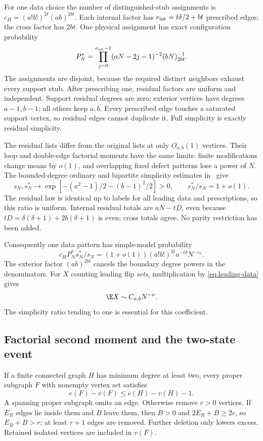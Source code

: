 For one data choice the number of distinguished-stub assignments is
$c_H=(a!b!)^{2t}(ab)^{2bt}$. Each internal factor has
$e_{\rm int}=t\delta/2+bt$ prescribed edges; the cross factor has $2bt$.
One physical assignment has exact configuration probability
\begin{equation}\label{eq:motif-probability}
 P_N^*=\prod_{j=0}^{e_{\rm int}-1}(aN-2j-1)^{-2}(bN)_{2bt}^{-1}.
\end{equation}
The assignments are disjoint, because the required distinct neighbors
exhaust every support stub. After prescribing one, residual factors are
uniform and independent. Support residual degrees are zero; exterior
vertices have degrees $a-1,b-1$; all others keep $a,b$.
Every prescribed edge touches a saturated support vertex, so residual
edges cannot duplicate it. Full simplicity is exactly residual simplicity.

The residual lists differ from the original lists at only $O_{a,b}(1)$
vertices. Their loop and double-edge factorial moments have the same
limits: finite modifications change means by $o(1)$, and overlapping
fixed defect patterns lose a power of $N$. The bounded-degree ordinary
and bipartite simplicity estimates in~\cite{JansonSimple} give
\[
 s_N,s_N^*\longrightarrow
 \exp[-(a^2-1)/2-(b-1)^2/2]>0,\qquad s_N^*/s_N=1+o(1).
\]
The residual law is identical up to labels for all leading data and
prescriptions, so this ratio is uniform. Internal residual totals are
$aN-tD$, even because $tD=\delta(\delta+1)+2b(\delta+1)$ is even;
cross totals agree. No parity restriction has been added.

Consequently one data pattern has simple-model probability
\begin{equation}\label{eq:motif-mean}
 c_HP_N^*s_N^*/s_N
 =(1+o(1))(a!b!)^{2t}a^{-t\delta}N^{-e_0}.
\end{equation}
The exterior factor $(ab)^{2bt}$ cancels the boundary degree powers
in the denominators. For $X$ counting leading flip \emph{sets},
multiplication by \eqref{eq:leading-data} gives
\begin{equation}\label{eq:leading-mean}
 \E X\sim C_{a,b}N^{-\nu}.
\end{equation}
The simplicity ratio tending to one is essential for this coefficient.

\subsection{Factorial second moment and the two-state event}
If a finite connected graph $H$ has minimum degree at least two,
every proper subgraph $F$ with nonempty vertex set satisfies
\begin{equation}\label{eq:proper-excess}
 e(F)-v(F)\le e(H)-v(H)-1.
\end{equation}
A spanning proper subgraph omits an edge. Otherwise remove $r>0$
vertices. If $E_R$ edges lie inside them and $B$ leave them, then
$B>0$ and $2E_R+B\ge2r$, so $E_R+B>r$; at least $r+1$ edges are
removed. Further deletion only lowers excess. Retained isolated vertices
are included in $v(F)$.

